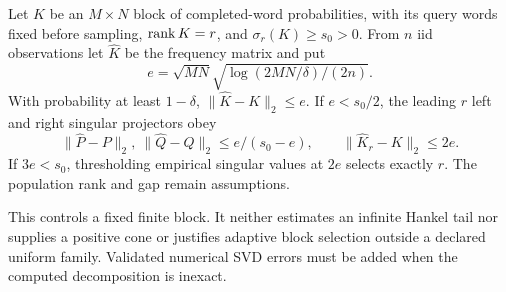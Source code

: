 \begin{proposition}
\label{II:U:prop:fixed-block-svd}
Let $K$ be an $M\times N$ block of completed-word probabilities,
with its query words fixed before sampling, $\operatorname{rank} K=r$, and
$\sigma_r(K)\ge s_0>0$. From $n$ iid observations let $\widehat K$
be the frequency matrix and put
\[
 e=\sqrt{MN}\sqrt{\log(2MN/\delta)/(2n)}.
\]
With probability at least $1-\delta$,
$\|\widehat K-K\|_2\le e$. If $e<s_0/2$, the leading $r$ left
and right singular projectors obey
\[
 \|\widehat P-P\|_2,\ \|\widehat Q-Q\|_2
          \le e/(s_0-e),\qquad
 \|\widehat K_r-K\|_2\le2e.
\]
If $3e<s_0$, thresholding empirical singular values at $2e$ selects
exactly $r$. The population rank and gap remain assumptions.
\end{proposition}

This controls a fixed finite block. It neither estimates an infinite
Hankel tail nor supplies a positive cone or justifies adaptive block
selection outside a declared uniform family. Validated numerical
SVD errors must be added when the computed decomposition is inexact.

